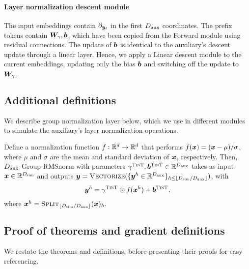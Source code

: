 \paragraph{\simulator{} Layer normalization descent module}
The input embeddings contain $\partial_{{\bm{y}}_t}$ in the first $D_{\text{aux}}$ coordinates. The prefix tokens contain ${\bm{W}}_{\mathbf{\gamma}}, {\bm{b}}$, which have been copied from the Forward module using residual connections. The update of ${\bm{b}}$ is identical to the auxiliary's descent update through a linear layer. Hence, we apply a \simulator{} Linear descent module to the current embeddings, updating only the bias ${\bm{b}}$ and switching off the update to ${\bm{W}}_{\gamma}.$ 





\subsection{Additional definitions}
We describe \simulator{} group normalization layer below, which we use in different modules to simulate the auxiliary's layer normalization operations.


\begin{definition}\label{def:group_norm}
    Define a normalization function $f:\mathbb{R}^d\to\mathbb{R}^d$ that performs $f({\bm{x}}) = ({\bm{x}}-\mu) / \sigma$, where $\mu$ and $\sigma$ are the mean and standard deviation of ${\bm{x}}$, respectively. Then, $D_{\text{aux}}$-Group RMSnorm with parameters ${\mathbf{\gamma}}^{\textsc{TinT}}, {{\bm{b}}}^{\textsc{TinT}} \in \mathbb{R}^{D_{\text{aux}}}$ takes as input  ${\bm{x}} \in \mathbb{R}^{D_{\text{sim}}}$ and outputs ${\bm{y}} = \textsc{Vectorize}( \{ {\bm{y}}^h \in \mathbb{R}^{D_{\text{aux}}} \}_{h \le \lfloor D_{\text{sim}}/D_{\text{aux}} \rfloor} )$, with
    \begin{align*}
        {\bm{y}}^h = {\mathbf{\gamma}}^{\textsc{TinT}} \odot f({\bm{x}}^h) + {{\bm{b}}}^{\textsc{TinT}},
    \end{align*}
    where ${\bm{x}}^h = \textsc{Split}_{\lfloor D_{\text{sim}}/D_{\text{aux}} \rfloor} ( {\bm{x}} )_h.$
\end{definition}




\subsection{Proof of theorems and gradient definitions}
We restate the theorems and definitions, before presenting their proofs for easy referencing.

